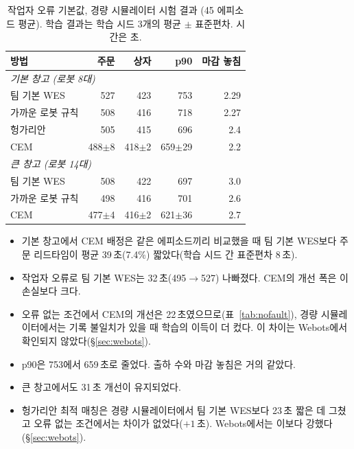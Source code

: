 \documentclass[10pt,twocolumn]{article}
\begin{document}
\begin{table}[t]
\centering
\caption{작업자 오류 기본값, 경량 시뮬레이터 시험 결과 (45 에피소드 평균). 학습 결과는 학습 시드 3개의 평균 $\pm$ 표준편차. 시간은 초.} %
\label{tab:fault}
\small
\begin{tabular}{lrrrr}
\toprule
방법 & 주문 & 상자 & p90 & 마감 놓침 \\
\midrule
\multicolumn{5}{l}{\emph{기본 창고 (로봇 8대)}} \\
팀 기본 WES & 527 & 423 & 753 & 2.29 \\
가까운 로봇 규칙 & 508 & 416 & 718 & 2.27 \\
헝가리안 & 505 & 415 & 696 & 2.4 \\ %
CEM & 488$\pm$8 & 418$\pm$2 & 659$\pm$29 & 2.2 \\
\midrule
\multicolumn{5}{l}{\emph{큰 창고 (로봇 14대)}} \\
팀 기본 WES & 508 & 422 & 697 & 3.0 \\
가까운 로봇 규칙 & 498 & 416 & 701 & 2.6 \\
CEM & 477$\pm$4 & 416$\pm$2 & 621$\pm$36 & 2.7 \\
\bottomrule
\end{tabular}
\end{table}

\begin{itemize}
  \item 기본 창고에서 CEM 배정은 같은 에피소드끼리 비교했을 때 팀 기본 WES보다 주문 리드타임이 평균 39\,초(7.4\%) 짧았다(학습 시드 간 표준편차 8\,초).
  \item 작업자 오류로 팀 기본 WES는 32\,초(495$\to$527) 나빠졌다. CEM의 개선 폭은 이 손실보다 크다.
  \item 오류 없는 조건에서 CEM의 개선은 22\,초였으므로(표~\ref{tab:nofault}), 경량 시뮬레이터에서는 기록 불일치가 있을 때 학습의 이득이 더 컸다. 이 차이는 Webots에서 확인되지 않았다(\S\ref{sec:webots}).
  \item p90은 753에서 659\,초로 줄었다. 출하 수와 마감 놓침은 거의 같았다.
  \item 큰 창고에서도 31\,초 개선이 유지되었다.
  \item 헝가리안 최적 매칭은 경량 시뮬레이터에서 팀 기본 WES보다 23\,초 짧은 데 그쳤고 오류 없는 조건에서는 차이가 없었다($+1$\,초). Webots에서는 이보다 강했다(\S\ref{sec:webots}).
\end{itemize}
\end{document}
